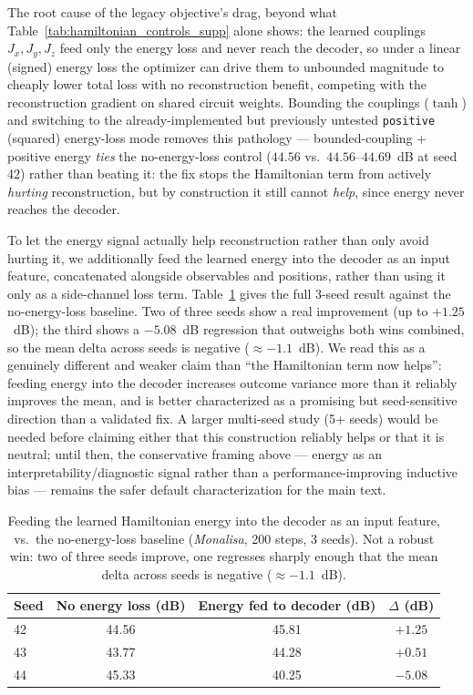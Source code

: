 \documentclass[11pt]{article}
\begin{document}
The root cause of the legacy objective's drag, beyond what Table~\ref{tab:hamiltonian_controls_supp} alone shows: the learned couplings $J_x,J_y,J_z$ feed only the energy loss and never reach the decoder, so under a linear (signed) energy loss the optimizer can drive them to unbounded magnitude to cheaply lower total loss with no reconstruction benefit, competing with the reconstruction gradient on shared circuit weights. Bounding the couplings ($\tanh$) and switching to the already-implemented but previously untested \texttt{positive} (squared) energy-loss mode removes this pathology --- bounded-coupling + positive energy \emph{ties} the no-energy-loss control ($44.56$ vs.\ $44.56$--$44.69$~dB at seed 42) rather than beating it: the fix stops the Hamiltonian term from actively \emph{hurting} reconstruction, but by construction it still cannot \emph{help}, since energy never reaches the decoder.

To let the energy signal actually help reconstruction rather than only avoid hurting it, we additionally feed the learned energy into the decoder as an input feature, concatenated alongside observables and positions, rather than using it only as a side-channel loss term. Table~\ref{tab:hamiltonian_decoder_feature} gives the full 3-seed result against the no-energy-loss baseline. Two of three seeds show a real improvement (up to $+1.25$~dB); the third shows a $-5.08$~dB regression that outweighs both wins combined, so the mean delta across seeds is negative ($\approx-1.1$~dB). We read this as a genuinely different and weaker claim than ``the Hamiltonian term now helps'': feeding energy into the decoder increases outcome variance more than it reliably improves the mean, and is better characterized as a promising but seed-sensitive direction than a validated fix. A larger multi-seed study (5+ seeds) would be needed before claiming either that this construction reliably helps or that it is neutral; until then, the conservative framing above --- energy as an interpretability/diagnostic signal rather than a performance-improving inductive bias --- remains the safer default characterization for the main text.

\begin{table}[H]
\centering
\caption{Feeding the learned Hamiltonian energy into the decoder as an input feature, vs.\ the no-energy-loss baseline (\textit{Monalisa}, 200 steps, 3 seeds). Not a robust win: two of three seeds improve, one regresses sharply enough that the mean delta across seeds is negative ($\approx-1.1$~dB).}
\label{tab:hamiltonian_decoder_feature}
\scriptsize
\begin{tabular}{lccc}
\toprule
Seed & No energy loss (dB) & Energy fed to decoder (dB) & $\Delta$ (dB) \\
\midrule
42 & 44.56 & 45.81 & $+1.25$ \\
43 & 43.77 & 44.28 & $+0.51$ \\
44 & 45.33 & 40.25 & $-5.08$ \\
\bottomrule
\end{tabular}
\end{table}
\end{document}
